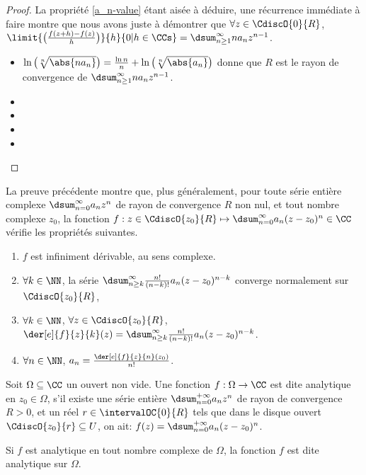 \begin{proof}
	La propriété \ref{a_n-value} étant aisée à déduire, une récurrence immédiate à faire montre que nous avons juste à démontrer que
	$\forall z \in \CdiscO{0}{R}$,
	$ \limit{\big( \frac{f(z+h) - f(z)}{h} \big)}%
	        {h}{0 | h \in \CCs}
	= \dsum_{n \geq 1}^{\infty} n a_n z^{n - 1}$.
	\begin{itemize}
		\item
		$ \ln \big( \sqrt[n]{\abs{n a_n}} \big)
		= \frac{\ln n}{n} + \ln \big( \sqrt[n]{\abs{a_n}} \big)$
		donne que
		$R$ est le rayon de convergence de
		$\dsum_{n \geq 1}^{\infty} n a_n z^{n - 1}$.


		\item 


		\item 


		\item 


		\item 
	\end{itemize}
\end{proof}


\begin{remark}
	La preuve précédente montre que, plus généralement,
	pour toute série entière complexe $\dsum_{n=0}^{\infty} a_n z^n$ de rayon de convergence $R$ non nul,
	et tout nombre complexe $z_0$,
	la fonction $f: z \in \CdiscO{z_0}{R} \mapsto \dsum_{n=0}^{\infty} a_n (z - z_0)^n \in \CC$ vérifie les propriétés suivantes.
    \begin{enumerate}
    	\item $f$ est infiniment dérivable, au sens complexe.

    	\item $\forall k \in \NN$,
		la série $\dsum_{n \geq k}^{\infty} \frac{n!}{(n-k)!} a_n (z - z_0)^{n - k}$ converge normalement sur $\CdiscO{z_0}{R}$,

    	\item $\forall k \in \NN$, $\forall z \in \CdiscO{z_0}{R}$,
		$\der[e]{f}{z}{k}(z) = \dsum_{n \geq k}^{\infty} \frac{n!}{(n-k)!} a_n (z - z_0)^{n - k}$.

    	\item $\forall n \in \NN$, $a_n = \frac{\der[e]{f}{z}{n}(z_0)}{n!}$.
    \end{enumerate}
\end{remark}




\begin{defi}
    Soit $\Omega \subseteq \CC$ un ouvert non vide.
	Une fonction $f: \Omega \rightarrow \CC$ est dite analytique en $z_0 \in \Omega$, 
	s'il existe
	une série entière $\dsum_{n = 0}^{+\infty} a_n z^n$
	de rayon de convergence $R > 0$,
	et
	un réel $r \in \intervalOC{0}{R}$ tels que dans le disque ouvert $\CdiscO{z_0}{r} \subseteq U$, on ait:
	$f(z) = \dsum_{n = 0}^{+\infty} a_n (z - z_0)^n$.

	\smallskip
	
	Si $f$ est analytique en tout nombre complexe de $\Omega$,
	la fonction $f$ est dite analytique sur $\Omega$.
\end{defi}


